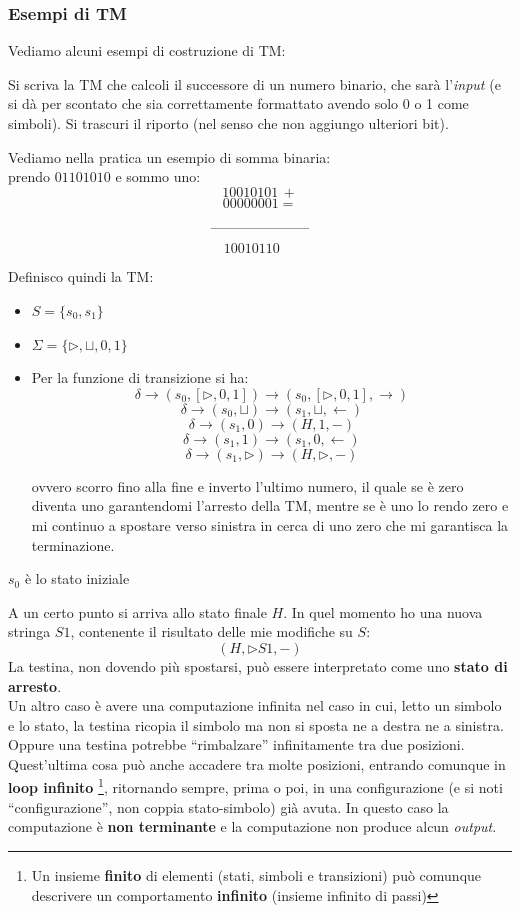 \subsubsection{Esempi di TM}
Vediamo alcuni esempi di costruzione di TM:
\begin{esempio}
  Si scriva la TM che calcoli il successore di un numero binario, che sarà
  l'\textit{input} (e si dà per scontato che sia correttamente formattato avendo solo 0 o
  1 come simboli). Si trascuri il riporto (nel senso che non aggiungo ulteriori
  bit).\\
  \begin{shaded}
    Vediamo nella pratica un esempio di somma binaria:\\
    prendo $01101010$ e sommo uno:
    \[10010101 \, +\]
    \[00000001=\]
    \[\rule{70pt}{.4pt}\]
    \[10010110\,\,\,\,\,\,\,\]
  \end{shaded}
  Definisco quindi la TM:
  \begin{itemize}
    \item $S=\{s_0,s_1\}$
    \item $\Sigma =\{\triangleright, \sqcup, 0,1\}$
    \item Per la funzione di transizione si ha:
    \[\delta\to(s_0,[\triangleright, 0,1])\to(s_0,[\triangleright, 0,1],
      \rightarrow)\]
    \[\delta\to(s_0,\sqcup)\to(s_1,\sqcup,\leftarrow)\]
    \[\delta\to(s_1,0)\to(H,1,-)\]
    \[\delta\to(s_1,1)\to(s_1,0,\leftarrow)\]
    \[\delta\to(s_1,\triangleright)\to(H,\triangleright,-)\]

    ovvero scorro fino alla fine e inverto l'ultimo numero, il quale se è zero diventa uno garantendomi 
    l'arresto della TM, mentre se è uno lo rendo zero e mi continuo a spostare verso sinistra in cerca di
    uno zero che mi garantisca la terminazione.
  \end{itemize}
    \item $s_0$ è lo stato iniziale
\end{esempio}
A un certo punto si arriva allo stato finale $H$. In quel momento ho
una nuova stringa $S1$, contenente il risultato delle mie modifiche su $S$:
\[(H,\triangleright S1, -)\]
La testina, non dovendo più spostarsi, può essere interpretato come uno \textbf{stato di arresto}.\\
Un altro caso è avere una computazione infinita nel caso in cui, letto un
simbolo e lo stato, la testina ricopia il simbolo ma non si sposta ne a destra
ne a sinistra. Oppure una testina potrebbe ``rimbalzare'' infinitamente tra due
posizioni. Quest'ultima cosa può anche accadere tra molte posizioni, entrando
comunque in \textbf{loop infinito} \footnote{Un insieme \textbf{finito} di elementi (stati, simboli e transizioni) può comunque descrivere un comportamento \textbf{infinito} (insieme infinito di passi)}, ritornando sempre, prima o poi, in una
configurazione (e si noti ``configurazione'', non coppia stato-simbolo) già
avuta. In questo caso la computazione è \textbf{non terminante} e la
computazione non produce alcun \textit{output}. \\


